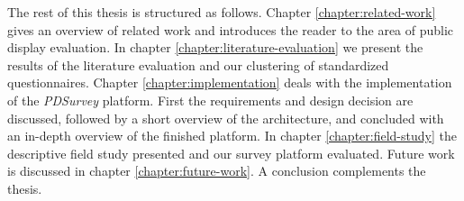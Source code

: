 	The rest of this thesis is structured as follows. Chapter \ref{chapter:related-work} gives an overview of related work and introduces the reader to the area of public display evaluation. In chapter \ref{chapter:literature-evaluation} we present the results of the literature evaluation and our clustering of standardized questionnaires. Chapter \ref{chapter:implementation} deals with the implementation of the \textit{PDSurvey} platform. First the requirements and design decision are discussed, followed by a short overview of the architecture, and concluded with an in-depth overview of the finished platform. In chapter \ref{chapter:field-study} the descriptive field study presented and our survey platform evaluated. Future work is discussed in chapter \ref{chapter:future-work}. A conclusion complements the thesis.










